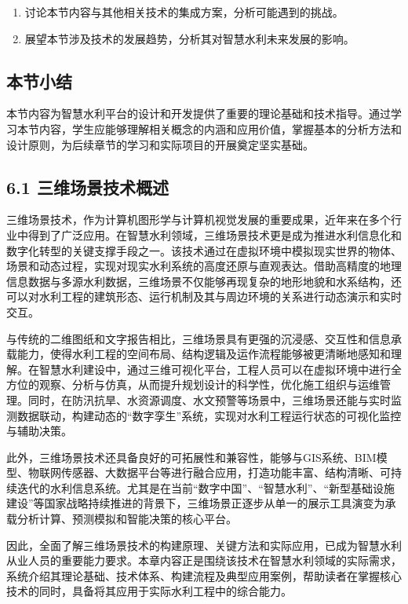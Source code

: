 \begin{enumerate}
\def\labelenumi{\arabic{enumi}.}
\setcounter{enumi}{6}
\tightlist
\item
  讨论本节内容与其他相关技术的集成方案，分析可能遇到的挑战。
\item
  展望本节涉及技术的发展趋势，分析其对智慧水利未来发展的影响。
\end{enumerate}

\subsection{本节小结}\label{ux672cux8282ux5c0fux7ed3}

本节内容为智慧水利平台的设计和开发提供了重要的理论基础和技术指导。通过学习本节内容，学生应能够理解相关概念的内涵和应用价值，掌握基本的分析方法和设计原则，为后续章节的学习和实际项目的开展奠定坚实基础。

\subsection{6.1 三维场景技术概述}\label{ux4e09ux7ef4ux573aux666fux6280ux672fux6982ux8ff0}

三维场景技术，作为计算机图形学与计算机视觉发展的重要成果，近年来在多个行业中得到了广泛应用。在智慧水利领域，三维场景技术更是成为推进水利信息化和数字化转型的关键支撑手段之一。该技术通过在虚拟环境中模拟现实世界的物体、场景和动态过程，实现对现实水利系统的高度还原与直观表达。借助高精度的地理信息数据与多源水利数据，三维场景不仅能够再现复杂的地形地貌和水系结构，还可以对水利工程的建筑形态、运行机制及其与周边环境的关系进行动态演示和实时交互。

与传统的二维图纸和文字报告相比，三维场景具有更强的沉浸感、交互性和信息承载能力，使得水利工程的空间布局、结构逻辑及运作流程能够被更清晰地感知和理解。在智慧水利建设中，通过三维可视化平台，工程人员可以在虚拟环境中进行全方位的观察、分析与仿真，从而提升规划设计的科学性，优化施工组织与运维管理。同时，在防汛抗旱、水资源调度、水文预警等场景中，三维场景还能与实时监测数据联动，构建动态的``数字孪生''系统，实现对水利工程运行状态的可视化监控与辅助决策。

此外，三维场景技术还具备良好的可拓展性和兼容性，能够与GIS系统、BIM模型、物联网传感器、大数据平台等进行融合应用，打造功能丰富、结构清晰、可持续迭代的水利信息系统。尤其是在当前``数字中国''、``智慧水利''、``新型基础设施建设''等国家战略持续推进的背景下，三维场景正逐步从单一的展示工具演变为承载分析计算、预测模拟和智能决策的核心平台。

因此，全面了解三维场景技术的构建原理、关键方法和实际应用，已成为智慧水利从业人员的重要能力要求。本章内容正是围绕该技术在智慧水利领域的实际需求，系统介绍其理论基础、技术体系、构建流程及典型应用案例，帮助读者在掌握核心技术的同时，具备将其应用于实际水利工程中的综合能力。

